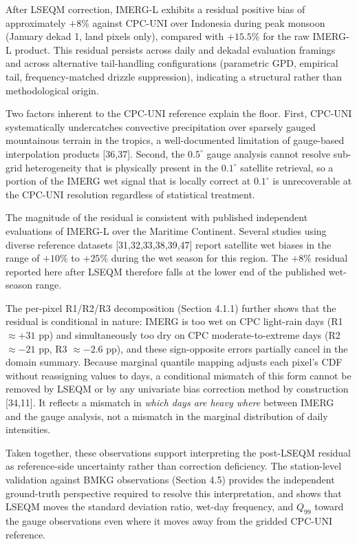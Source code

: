 \documentclass[
]{article}
\begin{document}
After LSEQM correction, IMERG-L exhibits a residual positive bias of
approximately \(+8\%\) against CPC-UNI over Indonesia during peak
monsoon (January dekad 1, land pixels only), compared with \(+15.5\%\)
for the raw IMERG-L product. This residual persists across daily and
dekadal evaluation framings and across alternative tail-handling
configurations (parametric GPD, empirical tail, frequency-matched
drizzle suppression), indicating a structural rather than methodological
origin.

Two factors inherent to the CPC-UNI reference explain the floor. First,
CPC-UNI systematically undercatches convective precipitation over
sparsely gauged mountainous terrain in the tropics, a well-documented
limitation of gauge-based interpolation products {[}36,37{]}. Second,
the \(0.5^{\circ}\) gauge analysis cannot resolve sub-grid heterogeneity
that is physically present in the \(0.1^{\circ}\) satellite retrieval,
so a portion of the IMERG wet signal that is locally correct at
\(0.1^{\circ}\) is unrecoverable at the CPC-UNI resolution regardless of
statistical treatment.

The magnitude of the residual is consistent with published independent
evaluations of IMERG-L over the Maritime Continent. Several studies
using diverse reference datasets {[}31,32,33,38,39,47{]} report
satellite wet biases in the range of \(+10\%\) to \(+25\%\) during the
wet season for this region. The \(+8\%\) residual reported here after
LSEQM therefore falls at the lower end of the published wet-season
range.

The per-pixel R1/R2/R3 decomposition (Section 4.1.1) further shows that
the residual is conditional in nature: IMERG is too wet on CPC
light-rain days (R1 \(\approx +31\) pp) and simultaneously too dry on
CPC moderate-to-extreme days (R2 \(\approx -21\) pp, R3 \(\approx -2.6\)
pp), and these sign-opposite errors partially cancel in the domain
summary. Because marginal quantile mapping adjusts each pixel's CDF
without reassigning values to days, a conditional mismatch of this form
cannot be removed by LSEQM or by any univariate bias correction method
by construction {[}34,11{]}. It reflects a mismatch in \emph{which days
are heavy where} between IMERG and the gauge analysis, not a mismatch in
the marginal distribution of daily intensities.

Taken together, these observations support interpreting the post-LSEQM
residual as reference-side uncertainty rather than correction
deficiency. The station-level validation against BMKG observations
(Section 4.5) provides the independent ground-truth perspective required
to resolve this interpretation, and shows that LSEQM moves the standard
deviation ratio, wet-day frequency, and \(Q_{99}\) toward the gauge
observations even where it moves away from the gridded CPC-UNI
reference.
\end{document}
